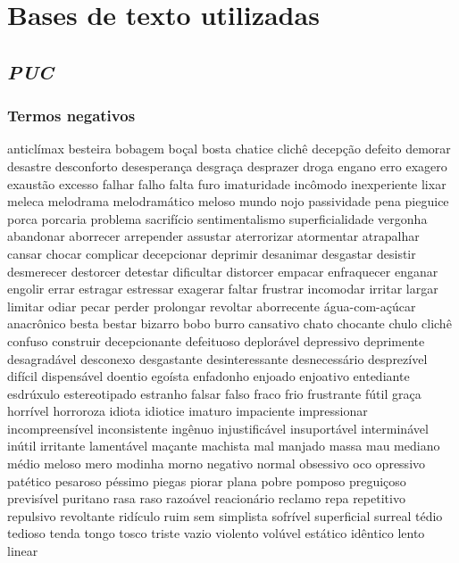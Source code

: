 \chapter{Bases de texto utilizadas}
\label{bases-palavras}

\section{\textit{PUC}}
\subsection{Termos negativos}
anticl\'{i}max besteira bobagem bo\c{c}al bosta chatice clich\^{e} decep\c{c}\~ao defeito demorar desastre desconforto desesperan\c{c}a desgra\c{c}a desprazer droga engano erro exagero exaust\~ao excesso falhar falho falta furo imaturidade inc\^{o}modo inexperiente lixar meleca melodrama melodram\'{a}tico meloso mundo nojo passividade pena pieguice porca porcaria problema sacrif\'{i}cio sentimentalismo superficialidade vergonha abandonar aborrecer arrepender assustar aterrorizar atormentar atrapalhar cansar chocar complicar decepcionar deprimir desanimar desgastar desistir desmerecer destorcer detestar dificultar distorcer empacar enfraquecer enganar engolir errar estragar estressar exagerar faltar frustrar incomodar irritar largar limitar odiar pecar perder prolongar revoltar aborrecente \'{a}gua-com-a\c{c}\'{u}car anacr\^{o}nico besta bestar bizarro bobo burro cansativo chato chocante chulo clich\^{e} confuso construir decepcionante defeituoso deplor\'{a}vel depressivo deprimente desagrad\'{a}vel desconexo desgastante desinteressante desnecess\'{a}rio desprez\'{i}vel dif\'{i}cil dispens\'{a}vel doentio ego\'{i}sta enfadonho enjoado enjoativo entediante esdr\'{u}xulo estereotipado estranho falsar falso fraco frio frustrante f\'{u}til gra\c{c}a horr\'{i}vel horroroza idiota idiotice imaturo impaciente impressionar incompreens\'{i}vel inconsistente ing\^{e}nuo injustific\'{a}vel insuport\'{a}vel intermin\'{a}vel in\'{u}til irritante lament\'{a}vel ma\c{c}ante machista mal manjado massa mau mediano m\'{e}dio meloso mero modinha morno negativo normal obsessivo oco opressivo pat\'{e}tico pesaroso p\'{e}ssimo piegas piorar plana pobre pomposo pregui\c{c}oso previs\'{i}vel puritano rasa raso razo\'{a}vel reacion\'{a}rio reclamo repa repetitivo repulsivo revoltante rid\'{i}culo ruim sem simplista sofr\'{i}vel superficial surreal t\'{e}dio tedioso tenda tongo tosco triste vazio violento vol\'{u}vel est\'{a}tico id\^{e}ntico lento linear 

